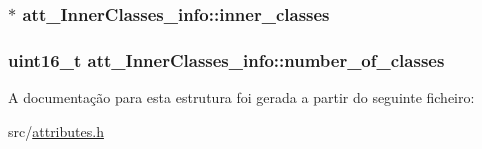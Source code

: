 \subsubsection[{\texorpdfstring{inner\+\_\+classes}{inner_classes}}]{$\ast$ att\+\_\+\+Inner\+Classes\+\_\+info\+::inner\+\_\+classes}\hypertarget{structatt__InnerClasses__info_a68beb2632952ef867172bfcfa327d256}{}\label{structatt__InnerClasses__info_a68beb2632952ef867172bfcfa327d256}
\subsubsection[{\texorpdfstring{number\+\_\+of\+\_\+classes}{number_of_classes}}]{\setlength{\rightskip}{0pt plus 5cm}uint16\+\_\+t att\+\_\+\+Inner\+Classes\+\_\+info\+::number\+\_\+of\+\_\+classes}\hypertarget{structatt__InnerClasses__info_a8bb396e50023f850c80a70e0b736cc77}{}\label{structatt__InnerClasses__info_a8bb396e50023f850c80a70e0b736cc77}


A documentação para esta estrutura foi gerada a partir do seguinte ficheiro\+:\begin{DoxyCompactItemize}
\item 
src/\hyperlink{attributes_8h}{attributes.\+h}\end{DoxyCompactItemize}
